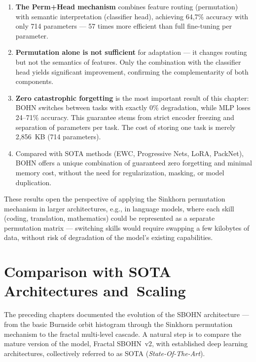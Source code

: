 \documentclass[11pt,a4paper]{report}
\begin{document}
\begin{enumerate}
    \item \textbf{The Perm+Head mechanism} combines feature routing (permutation) with semantic interpretation (classifier head), achieving 64{,}7\% accuracy with only 714 parameters --- 57 times more efficient than full fine-tuning per parameter.

    \item \textbf{Permutation alone is not sufficient} for adaptation --- it changes routing but not the semantics of features. Only the combination with the classifier head yields significant improvement, confirming the complementarity of both components.

    \item \textbf{Zero catastrophic forgetting} is the most important result of this chapter: BOHN switches between tasks with exactly 0\% degradation, while MLP loses 24--71\% accuracy. This guarantee stems from strict encoder freezing and separation of parameters per task. The cost of storing one task is merely 2{,}856~KB (714 parameters).

    \item Compared with SOTA methods (EWC, Progressive Nets, LoRA, PackNet), BOHN offers a unique combination of guaranteed zero forgetting and minimal memory cost, without the need for regularization, masking, or model duplication.
\end{enumerate}

These results open the perspective of applying the Sinkhorn permutation mechanism in larger architectures, e.g., in language models, where each skill (coding, translation, mathematics) could be represented as a separate permutation matrix --- switching skills would require swapping a few kilobytes of data, without risk of degradation of the model's existing capabilities.



\chapter{Comparison with SOTA Architectures and~Scaling}

The preceding chapters documented the evolution of the SBOHN architecture --- from the basic Burnside orbit histogram through the Sinkhorn permutation mechanism to the fractal multi-level cascade. A natural step is to compare the mature version of the model, Fractal SBOHN~v2, with established deep learning architectures, collectively referred to as SOTA (\emph{State-Of-The-Art}).
\end{document}
